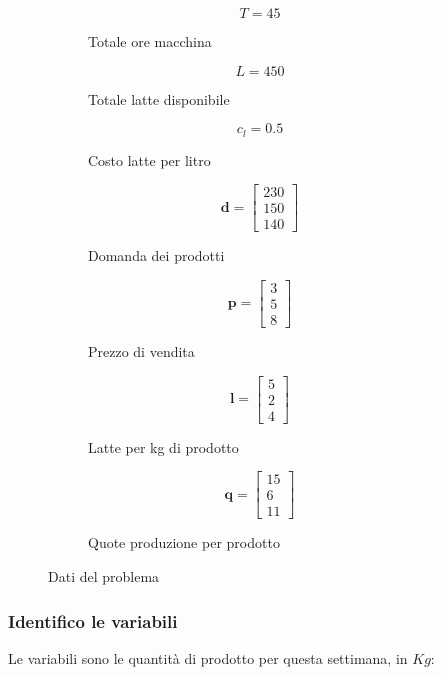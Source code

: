 \documentclass[\main/main.tex]{subfiles}
\begin{document}
\begin{figure}
  \begin{subfigure}{0.31\textwidth}
    \[
      T = 45
    \]
    \caption{Totale ore macchina}
  \end{subfigure}
  \begin{subfigure}{0.31\textwidth}
    \[
      L = 450
    \]
    \caption{Totale latte disponibile}
  \end{subfigure}
  \begin{subfigure}{0.31\textwidth}
    \[
      c_l = 0.5
    \]
    \caption{Costo latte per litro}
  \end{subfigure}
  \begin{subfigure}{0.24\textwidth}
    \[
      \bm{d} = \begin{bmatrix}
        230 \\
        150 \\
        140
      \end{bmatrix}
    \]
    \caption{Domanda dei prodotti}
  \end{subfigure}
  \begin{subfigure}{0.24\textwidth}
    \[
      \bm{p} = \begin{bmatrix}
        3 \\
        5 \\
        8
      \end{bmatrix}
    \]
    \caption{Prezzo di vendita}
  \end{subfigure}
  \begin{subfigure}{0.24\textwidth}
    \[
      \bm{l} = \begin{bmatrix}
        5 \\
        2 \\
        4
      \end{bmatrix}
    \]
    \caption{Latte per kg di prodotto}
  \end{subfigure}
  \begin{subfigure}{0.24\textwidth}
    \[
      \bm{q} = \begin{bmatrix}
        15 \\
        6  \\
        11
      \end{bmatrix}
    \]
    \caption{Quote produzione per prodotto}
  \end{subfigure}
  \caption{Dati del problema}
\end{figure}
\subsubsection*{Identifico le variabili}
Le variabili sono le quantità di prodotto per questa settimana, in $Kg$:
\end{document}
